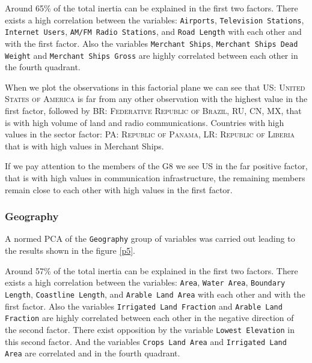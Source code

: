 \documentclass[a4paper,10pt,twocolumn]{article}
\begin{document}
Around 65\% of the total inertia can be explained in the first two factors. There exists a high correlation between the variables: \texttt{Airports}, \texttt{Television Stations}, \texttt{Internet Users}, \texttt{AM/FM Radio Stations}, and \texttt{Road Length} with each other and with the first factor. Also the variables \texttt{Merchant Ships}, \texttt{Merchant Ships Dead Weight} and \texttt{Merchant Ships Gross} are highly correlated between each other in the fourth quadrant. 

When we plot the observations in this factorial plane we can see that \textsc{US: United States of America} is far from any other observation with the highest value in the first factor, followed by \textsc{BR: Federative Republic of Brazil}, \textsc{RU}, \textsc{CN}, \textsc{MX}, that is with high volume of land and radio communications. Countries with high values in the sector factor: \textsc{PA: Republic of Panama}, \textsc{LR: Republic of Liberia} that is with high values in Merchant Ships.

If we pay attention to the members of the \textsc{G8} we see \textsc{US} in the far positive factor, that is with high values in communication infrastructure, the remaining members remain close to each other with high values in the first factor.

\subsubsection{Geography}
A normed PCA of the \texttt{Geography} group of variables was carried out leading to the results shown in the figure \ref{p5}. 

Around 57\% of the total inertia can be explained in the first two factors. There exists a high correlation between the variables: \texttt{Area}, \texttt{Water Area}, \texttt{Boundary Length}, \texttt{Coastline Length}, and \texttt{Arable Land Area} with each other and with the first factor. Also the variables \texttt{Irrigated Land Fraction} and \texttt{Arable Land Fraction}  are highly correlated between each other in the negative direction of the second factor. There exist opposition by the variable \texttt{Lowest Elevation} in this second factor. And the variables \texttt{Crops Land Area} and \texttt{Irrigated Land Area} are correlated and in the fourth quadrant. 
\end{document}
